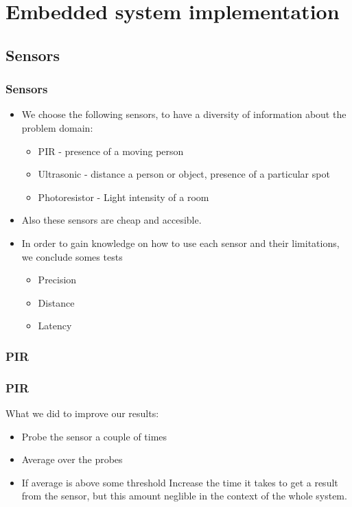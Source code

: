\section{Embedded system implementation}
\lstset{language=HMMLanguage,numbers=left,breaklines=true,numbersep=0pt}
\subsection{Sensors}
\begin{frame}
	\frametitle{Sensors}
	\begin{itemize}
		\item We choose the following sensors, to have a diversity of information about the problem domain:
		\begin{itemize}
		  \item PIR - presence of a moving person
		  \item Ultrasonic - distance a person or object, presence of a particular spot
		  \item Photoresistor - Light intensity of a room
		\end{itemize}
		\item Also these sensors are cheap and accesible.
		\item In order to gain knowledge on how to use each sensor and their limitations, we conclude somes tests
		\begin{itemize}
		  \item Precision
		  \item Distance
		  \item Latency
		\end{itemize}
	\end{itemize}
\end{frame}
\subsubsection{PIR}
\begin{frame}
  \frametitle{PIR}
  What we did to improve our results:
	\begin{itemize}
	  \item Probe the sensor a couple of times
	  \item Average over the probes
	  \item If average is above some threshold
	Increase the time it takes to get a result from the sensor, but this amount neglible in the context of the whole system.
	\end{itemize}
\end{frame}
